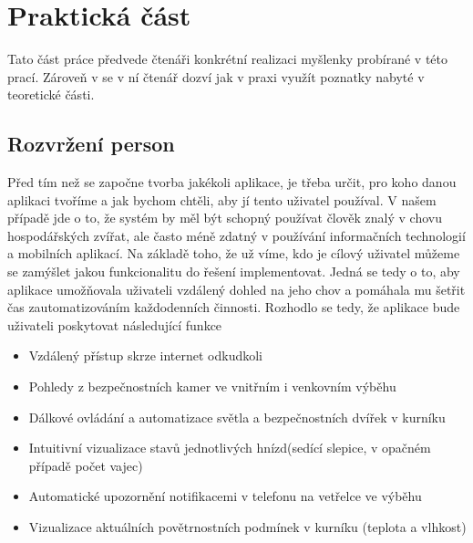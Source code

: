 


\chapter{Praktická část}\label{ch:prakticka-cast}
Tato část práce předvede čtenáři konkrétní realizaci myšlenky probírané v této prací.
Zároveň v se v ní čtenář dozví jak v praxi využít poznatky nabyté v teoretické části.


\section{Rozvržení person}\label{sec:rozvrzeni-person}
Před tím než se započne tvorba jakékoli aplikace, je třeba určit, pro koho danou aplikaci tvoříme a jak bychom chtěli, aby jí tento uživatel používal.
V našem případě jde o to, že systém by měl být schopný používat člověk znalý v chovu hospodářských zvířat, ale často méně zdatný v používání informačních technologií a mobilních aplikací.
Na základě toho, že už víme, kdo je cílový uživatel můžeme se zamýšlet jakou funkcionalitu do řešení implementovat.
Jedná se tedy o to, aby aplikace umožňovala uživateli vzdálený dohled na jeho chov a pomáhala mu šetřit čas zautomatizováním každodenních činnosti.
Rozhodlo se tedy, že aplikace bude uživateli poskytovat následující funkce
\begin{itemize}
    \item Vzdálený přístup skrze internet odkudkoli
    \item Pohledy z bezpečnostních kamer ve vnitřním i venkovním výběhu
    \item Dálkové ovládání a automatizace světla a bezpečnostních dvířek v kurníku
    \item Intuitivní vizualizace stavů jednotlivých hnízd(sedící slepice, v opačném případě počet vajec)
    \item Automatické upozornění notifikacemi v telefonu na vetřelce ve výběhu
    \item Vizualizace aktuálních povětrnostních podmínek v kurníku (teplota a vlhkost)
\end{itemize}

